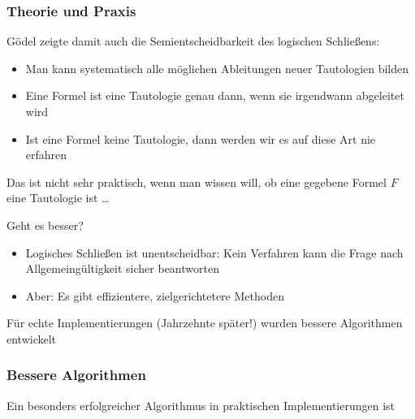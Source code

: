 \documentclass[aspectratio=1610,onlymath]{beamer}
\begin{document}
\begin{frame}\frametitle{Theorie und Praxis}

Gödel zeigte damit auch die Semientscheidbarkeit des logischen Schließens:
\begin{itemize}
\item Man kann systematisch alle möglichen Ableitungen neuer Tautologien
bilden
\item Eine Formel ist eine Tautologie genau dann, wenn sie irgendwann abgeleitet wird
\item Ist eine Formel keine Tautologie, dann werden wir es auf diese Art nie erfahren
\end{itemize}\pause

Das ist nicht sehr praktisch, wenn man wissen will, ob eine gegebene Formel $F$ eine
Tautologie ist \ldots
\bigskip

\alert{Geht es besser?}\pause
\begin{itemize}
\item Logisches Schließen ist unentscheidbar: Kein Verfahren kann die Frage nach Allgemeingültigkeit sicher beantworten
\item Aber: Es gibt effizientere, zielgerichtetere Methoden
\end{itemize}

Für echte Implementierungen (Jahrzehnte später!) wurden bessere Algorithmen entwickelt

\end{frame}

\begin{frame}\frametitle{Bessere Algorithmen}\pause

Ein besonders erfolgreicher Algorithmus in praktischen Implementierungen ist
\bigskip\pause


\end{frame}
\end{document}
